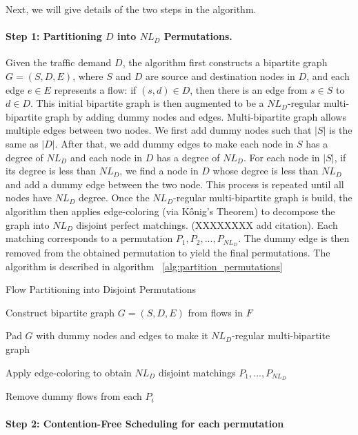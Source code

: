 Next, we
will give details of the two steps in the algorithm.

\paragraph{Step 1: Partitioning $D$ into $NL_D$ Permutations.}
Given the traffic demand $D$, the algorithm first constructs a
bipartite graph \( G = (S, D, E) \), where \( S \) and \( D \) are
source and destination nodes in $D$, and each edge \( e \in E \) represents
a flow: if $(s, d) \in D$, then there is an edge from $s\in S$ to $d\in D$. 
This initial bipartite graph is then augmented to be a $NL_D$-regular
multi-bipartite graph by adding dummy nodes and edges. Multi-bipartite graph
allows multiple edges between two nodes. We first add dummy nodes such that
$|S|$ is the same as $|D|$. After that, we add dummy edges to make each node
in $S$ has a degree of $NL_D$ and each node in $D$ has a degree of $NL_D$.
For each node in $|S|$, if its degree is less than $NL_D$, we find a node
in $D$ whose degree is less than $NL_D$ and add a dummy edge between the
two node. This process is repeated until all nodes have $NL_D$ degree. Once
the $NL_D$-regular multi-bipartite graph is build, 
the algorithm then applies edge-coloring (via Kőnig’s Theorem)
to decompose the graph into \( NL_D \) disjoint perfect matchings.
(XXXXXXXX add citation). Each matching corresponds to a permutation
\( P_1, P_2, ..., P_{NL_D} \). The dummy edge is then removed from the
obtained permutation to yield the final permutations.
The algorithm is described in algorithm ~\ref{alg:partition_permutations}

\begin{algorithm}[H]
\DontPrintSemicolon
\caption{Flow Partitioning into Disjoint Permutations}
\label{alg:partition_permutations}


Construct bipartite graph $G = (S, D, E)$ from flows in $F$\;

Pad $G$ with dummy nodes and edges to make it $NL_D$-regular multi-bipartite
graph\;

Apply edge-coloring to obtain $NL_D$ disjoint matchings $P_1, ..., P_{NL_D}$\;

Remove dummy flows from each $P_i$\;

\end{algorithm}

\paragraph{Step 2: Contention-Free Scheduling for each permutation}  

